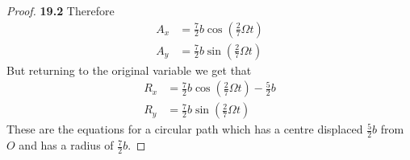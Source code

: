 \documentclass[11pt]{article}
\theoremstyle{definition}
\begin{document}
\begin{proof}{\textbf{19.2}}
    Therefore
    \begin{align*}
        A_x &= \frac{7}{2}b\cos(\frac{2}{7}\Omega t)\\
        A_y &= \frac{7}{2}b\sin(\frac{2}{7}\Omega t)
    \end{align*}
    But returning to the original variable we get that
    \begin{align*}
        R_x &= \frac{7}{2}b\cos(\frac{2}{7}\Omega t) - \frac{5}{2}b\\
        R_y &= \frac{7}{2}b\sin(\frac{2}{7}\Omega t)
    \end{align*}
    These are the equations for a circular path which has a centre displaced
    $\frac{5}{2}b$ from $O$ and has a radius of $\frac{7}{2}b$.


\end{proof}
\end{document}
